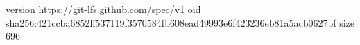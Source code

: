 version https://git-lfs.github.com/spec/v1
oid sha256:421ccba6852ff537119f3570584fb608ead49993e6f423236eb81a5acb0627bf
size 696
